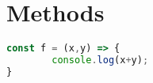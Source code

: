 \chapter{Methods}

\begin{lstlisting}[language=js]
const f = (x,y) => {
		console.log(x+y);
}
\end{lstlisting}
